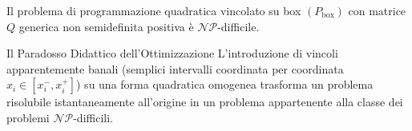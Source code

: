 \begin{theorem}
Il problema di programmazione quadratica vincolato su box $(P_{\text{box}})$ con matrice $Q$ generica non semidefinita positiva \`e $\mathcal{NP}$-difficile.
\end{theorem}

\begin{alertblock}{Il Paradosso Didattico dell'Ottimizzazione}
L'introduzione di vincoli apparentemente banali (semplici intervalli coordinata per coordinata $x_i \in [x_i^-, x_i^+]$) su una forma quadratica omogenea trasforma un problema risolubile istantaneamente all'origine in un problema appartenente alla classe dei problemi $\mathcal{NP}$-difficili.
\end{alertblock}
